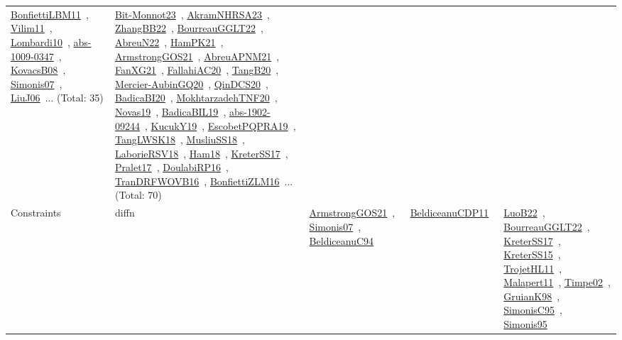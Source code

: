 {\begin{longtable}{lp{3cm}>{\raggedright\arraybackslash}p{6cm}>{\raggedright\arraybackslash}p{6cm}>{\raggedright\arraybackslash}p{8cm}}
\href{works/BonfiettiLBM11.pdf}{BonfiettiLBM11}~\cite{BonfiettiLBM11}, \href{works/Vilim11.pdf}{Vilim11}~\cite{Vilim11}, \href{works/Lombardi10.pdf}{Lombardi10}~\cite{Lombardi10}, \href{works/abs-1009-0347.pdf}{abs-1009-0347}~\cite{abs-1009-0347}, \href{works/KovacsB08.pdf}{KovacsB08}~\cite{KovacsB08}, \href{works/Simonis07.pdf}{Simonis07}~\cite{Simonis07}, \href{works/LiuJ06.pdf}{LiuJ06}~\cite{LiuJ06}... (Total: 35) & \href{works/Bit-Monnot23.pdf}{Bit-Monnot23}~\cite{Bit-Monnot23}, \href{works/AkramNHRSA23.pdf}{AkramNHRSA23}~\cite{AkramNHRSA23}, \href{works/ZhangBB22.pdf}{ZhangBB22}~\cite{ZhangBB22}, \href{works/BourreauGGLT22.pdf}{BourreauGGLT22}~\cite{BourreauGGLT22}, \href{works/AbreuN22.pdf}{AbreuN22}~\cite{AbreuN22}, \href{works/HamPK21.pdf}{HamPK21}~\cite{HamPK21}, \href{works/ArmstrongGOS21.pdf}{ArmstrongGOS21}~\cite{ArmstrongGOS21}, \href{works/AbreuAPNM21.pdf}{AbreuAPNM21}~\cite{AbreuAPNM21}, \href{works/FanXG21.pdf}{FanXG21}~\cite{FanXG21}, \href{works/FallahiAC20.pdf}{FallahiAC20}~\cite{FallahiAC20}, \href{works/TangB20.pdf}{TangB20}~\cite{TangB20}, \href{works/Mercier-AubinGQ20.pdf}{Mercier-AubinGQ20}~\cite{Mercier-AubinGQ20}, \href{works/QinDCS20.pdf}{QinDCS20}~\cite{QinDCS20}, \href{works/BadicaBI20.pdf}{BadicaBI20}~\cite{BadicaBI20}, \href{works/MokhtarzadehTNF20.pdf}{MokhtarzadehTNF20}~\cite{MokhtarzadehTNF20}, \href{works/Novas19.pdf}{Novas19}~\cite{Novas19}, \href{works/BadicaBIL19.pdf}{BadicaBIL19}~\cite{BadicaBIL19}, \href{works/abs-1902-09244.pdf}{abs-1902-09244}~\cite{abs-1902-09244}, \href{works/KucukY19.pdf}{KucukY19}~\cite{KucukY19}, \href{works/EscobetPQPRA19.pdf}{EscobetPQPRA19}~\cite{EscobetPQPRA19}, \href{works/TangLWSK18.pdf}{TangLWSK18}~\cite{TangLWSK18}, \href{works/MusliuSS18.pdf}{MusliuSS18}~\cite{MusliuSS18}, \href{works/LaborieRSV18.pdf}{LaborieRSV18}~\cite{LaborieRSV18}, \href{works/Ham18.pdf}{Ham18}~\cite{Ham18}, \href{works/KreterSS17.pdf}{KreterSS17}~\cite{KreterSS17}, \href{works/Pralet17.pdf}{Pralet17}~\cite{Pralet17}, \href{works/DoulabiRP16.pdf}{DoulabiRP16}~\cite{DoulabiRP16}, \href{works/TranDRFWOVB16.pdf}{TranDRFWOVB16}~\cite{TranDRFWOVB16}, \href{works/BonfiettiZLM16.pdf}{BonfiettiZLM16}~\cite{BonfiettiZLM16}... (Total: 70)\\
Constraints & diffn & \href{works/ArmstrongGOS21.pdf}{ArmstrongGOS21}~\cite{ArmstrongGOS21}, \href{works/Simonis07.pdf}{Simonis07}~\cite{Simonis07}, \href{works/BeldiceanuC94.pdf}{BeldiceanuC94}~\cite{BeldiceanuC94} & \href{works/BeldiceanuCDP11.pdf}{BeldiceanuCDP11}~\cite{BeldiceanuCDP11} & \href{works/LuoB22.pdf}{LuoB22}~\cite{LuoB22}, \href{works/BourreauGGLT22.pdf}{BourreauGGLT22}~\cite{BourreauGGLT22}, \href{works/KreterSS17.pdf}{KreterSS17}~\cite{KreterSS17}, \href{works/KreterSS15.pdf}{KreterSS15}~\cite{KreterSS15}, \href{works/TrojetHL11.pdf}{TrojetHL11}~\cite{TrojetHL11}, \href{works/Malapert11.pdf}{Malapert11}~\cite{Malapert11}, \href{works/Timpe02.pdf}{Timpe02}~\cite{Timpe02}, \href{works/GruianK98.pdf}{GruianK98}~\cite{GruianK98}, \href{works/SimonisC95.pdf}{SimonisC95}~\cite{SimonisC95}, \href{works/Simonis95.pdf}{Simonis95}~\cite{Simonis95}\\

\end{longtable}}

